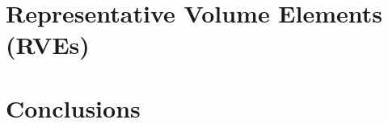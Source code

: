 \documentclass[a4paper,fleqn]{cas-dc}
\begin{document}
\section{Representative Volume Elements (RVEs)}










\section{Conclusions}




%





%
%
\end{document}
